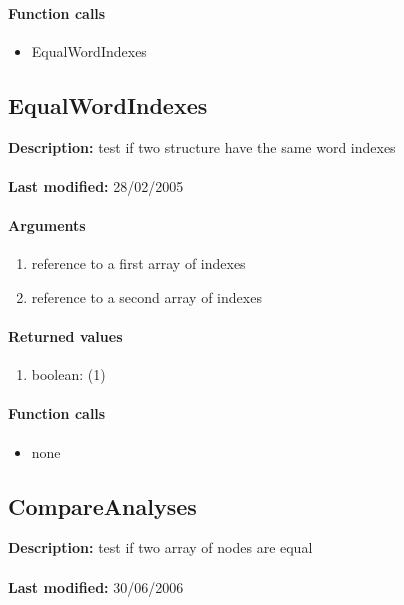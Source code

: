 \paragraph{Function calls}
\begin{itemize}
\item EqualWordIndexes
\end{itemize}

\subsection{EqualWordIndexes}
\textbf{Description:} test if two structure have the same word indexes\\
\\\textbf{Last modified:} 28/02/2005

\paragraph{Arguments}
\begin{enumerate}
\item reference to a first array of indexes
\item reference to a second array of indexes
\end{enumerate}

\paragraph{Returned values}
\begin{enumerate}
\item boolean: (1)
\end{enumerate}

\paragraph{Function calls}
\begin{itemize}
\item none
\end{itemize}

\subsection{CompareAnalyses}
\textbf{Description:} test if two array of nodes are equal\\
\\\textbf{Last modified:} 30/06/2006

